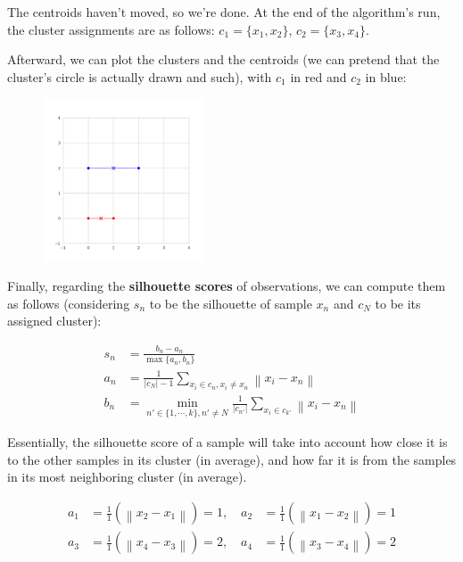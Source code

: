 \documentclass[12pt]{article}
\begin{document}
\begin{enumerate}[leftmargin=\labelsep]
  The centroids haven't moved, so we're done. At the end of the algorithm's run,
  the cluster assignments are as follows: $c_1 = \{x_1, x_2\}$, $c_2 = \{x_3, x_4\}$.

  Afterward, we can plot the clusters and the centroids (we can pretend that the
  cluster's circle is actually drawn and such), with $c_1$ in red and $c_2$ in blue:

  \begin{figure}[H]
    \centering
    \includegraphics[width=0.43\textwidth]{assets/k-means-clusters.png}
    \label{fig:ex-1}
  \end{figure}

  Finally, regarding the \textbf{silhouette scores} of observations, we can compute them as follows
  (considering $s_n$ to be the silhouette of sample $x_n$ and $c_N$ to be its assigned cluster):

  \begin{equation*}
    \begin{aligned}
      s_n & = \frac{b_n - a_n}{\max\{a_n, b_n\}}                                                                            \\
      a_n & = \frac{1}{|c_N| - 1} \sum_{x_i \in c_n, x_i \neq x_n} \left\| x_i - x_n \right\|                               \\
      b_n & = \min_{n' \in \{1, \cdots, k\}, n' \neq N} \frac{1}{|c_{n'}|} \sum_{x_i \in c_{k'}} \left\| x_i - x_n \right\|
    \end{aligned}
  \end{equation*}

  Essentially, the silhouette score of a sample will take into account how close it is to
  the other samples in its cluster (in average), and how far it is from the samples in its
  most neighboring cluster (in average).

  \begin{equation*}
    \begin{aligned}
      a_1 & = \frac{1}{1} \left( \left\| x_2 - x_1 \right\| \right) =  1, \quad
      a_2 & = \frac{1}{1} \left( \left\| x_1 - x_2 \right\| \right) =  1        \\
      a_3 & = \frac{1}{1} \left( \left\| x_4 - x_3 \right\| \right) =  2, \quad
      a_4 & = \frac{1}{1} \left( \left\| x_3 - x_4 \right\| \right) = 2
    \end{aligned}
  \end{equation*}


\end{enumerate}
\end{document}
